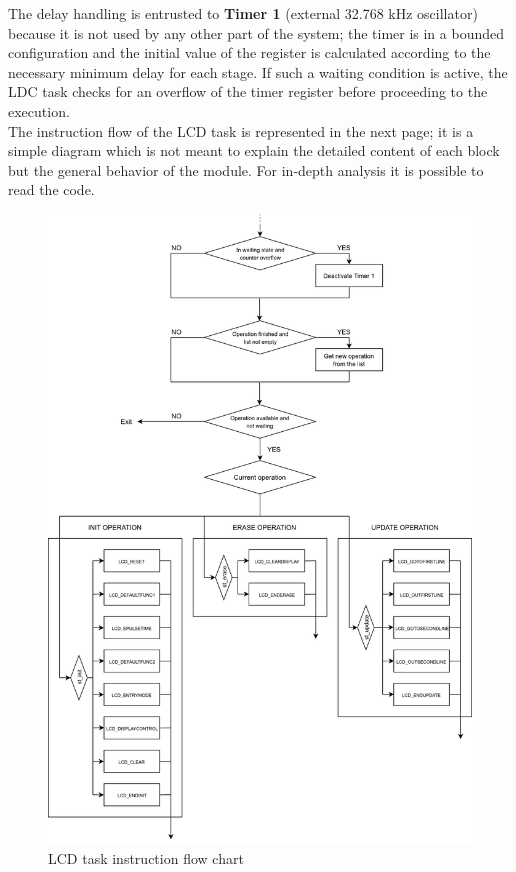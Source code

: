 The delay handling is entrusted to \textbf{Timer 1} (external 32.768 kHz oscillator) because it is not used by any other part of the system; the timer is in a bounded configuration and the initial value of the register is calculated according to the necessary minimum delay for each stage. If such a waiting condition is active, the LDC task checks for an overflow of the timer register before proceeding to the execution.\\

The instruction flow of the LCD task is represented in the next page; it is a simple diagram which is not meant to explain the detailed content of each block but the general behavior of the module. For in-depth analysis it is possible to read the code.

\begin{figure}
	\centering
	\includegraphics[width=\linewidth]{images/lcdnonblocking2}
	\caption{LCD task instruction flow chart}
	\label{fig:lcdnonblocking2}
\end{figure}

